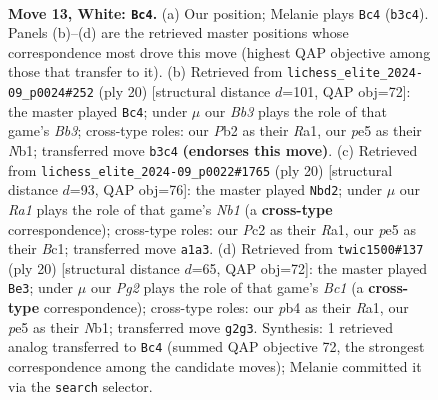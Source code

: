 \documentclass[11pt]{article}
\begin{document}
\clearpage

\begin{figure}[p]\centering
\begin{subfigure}{0.46\textwidth}\centering
\resizebox{\linewidth}{!}{%
\newchessgame
\chessboard[
  setfen={r1bq1rk1/2p1bp1p/p1np1np1/4p3/Pp2P3/1B1P1Q1N/1PP2PPP/RNB1R1K1 w - - 0 13},
  showmover=false,
  pgfstyle=straightmove, color=movearrow, markmove={b3-c4}
]}
\caption{}
\end{subfigure}\hfill
\begin{subfigure}{0.46\textwidth}\centering
\resizebox{\linewidth}{!}{%
\newchessgame
\chessboard[
  setfen={1rbq1rk1/2p1bppp/p1np1n2/P3p3/1p2P3/1BP2N2/1P1P1PPP/RNBQR1K1 w - - 1 11},
  showmover=false,
  pgfstyle=straightmove, color=movearrow, markmove={b3-c4}
]}
\caption{}
\end{subfigure}
\\[4pt]
\begin{subfigure}{0.46\textwidth}\centering
\resizebox{\linewidth}{!}{%
\newchessgame
\chessboard[
  setfen={1rbq1rk1/2p1bpp1/p1np1n1p/1p2p3/P3P3/1BPP1N2/1P3PPP/RNBQR1K1 w - - 0 11},
  showmover=false,
  pgfstyle=straightmove, color=movearrow, markmove={b1-d2}
]}
\caption{}
\end{subfigure}\hfill
\begin{subfigure}{0.46\textwidth}\centering
\resizebox{\linewidth}{!}{%
\newchessgame
\chessboard[
  setfen={1rbq1rk1/2p1bppp/p1np1n2/P3p3/1p2P3/1B1P1N2/1PP2PPP/RNBQR1K1 w - - 1 11},
  showmover=false,
  pgfstyle=straightmove, color=movearrow, markmove={c1-e3}
]}
\caption{}
\end{subfigure}
\caption{\textbf{Move 13, White: \texttt{Bc4}.} (a) Our position; Melanie plays \texttt{Bc4} (\texttt{b3c4}). Panels (b)--(d) are the retrieved master positions whose correspondence most drove this move (highest QAP objective among those that transfer to it). (b) Retrieved from \texttt{lichess\_elite\_2024-09\_p0024\#252} (ply 20) [structural distance $d$=101, QAP obj=72]: the master played \texttt{Bc4}; under $\mu$ our \emph{Bb3} plays the role of that game's \emph{Bb3}; cross-type roles: our \emph{P}b2 as their \emph{R}a1, our \emph{p}e5 as their \emph{N}b1; transferred move \texttt{b3c4} \textbf{(endorses this move)}. (c) Retrieved from \texttt{lichess\_elite\_2024-09\_p0022\#1765} (ply 20) [structural distance $d$=93, QAP obj=76]: the master played \texttt{Nbd2}; under $\mu$ our \emph{Ra1} plays the role of that game's \emph{Nb1} (a \textbf{cross-type} correspondence); cross-type roles: our \emph{P}c2 as their \emph{R}a1, our \emph{p}e5 as their \emph{B}c1; transferred move \texttt{a1a3}. (d) Retrieved from \texttt{twic1500\#137} (ply 20) [structural distance $d$=65, QAP obj=72]: the master played \texttt{Be3}; under $\mu$ our \emph{Pg2} plays the role of that game's \emph{Bc1} (a \textbf{cross-type} correspondence); cross-type roles: our \emph{p}b4 as their \emph{R}a1, our \emph{p}e5 as their \emph{N}b1; transferred move \texttt{g2g3}. Synthesis: 1 retrieved analog transferred to \texttt{Bc4} (summed QAP objective 72, the strongest correspondence among the candidate moves); Melanie committed it via the \texttt{search} selector.}
\label{fig:thought-m24}
\end{figure}
\end{document}
